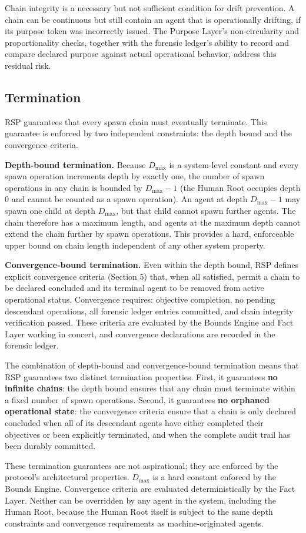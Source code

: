 Chain integrity is a necessary but not sufficient condition for drift prevention. A chain can be continuous but still contain an agent that is operationally drifting, if its purpose token was incorrectly issued. The Purpose Layer's non-circularity and proportionality checks, together with the forensic ledger's ability to record and compare declared purpose against actual operational behavior, address this residual risk.

\subsection{Termination}

RSP guarantees that every spawn chain must eventually terminate. This guarantee is enforced by two independent constraints: the depth bound and the convergence criteria.

\textbf{Depth-bound termination.} Because $D_{\max}$ is a system-level constant and every spawn operation increments depth by exactly one, the number of spawn operations in any chain is bounded by $D_{\max} - 1$ (the Human Root occupies depth 0 and cannot be counted as a spawn operation). An agent at depth $D_{\max} - 1$ may spawn one child at depth $D_{\max}$, but that child cannot spawn further agents. The chain therefore has a maximum length, and agents at the maximum depth cannot extend the chain further by spawn operations. This provides a hard, enforceable upper bound on chain length independent of any other system property.

\textbf{Convergence-bound termination.} Even within the depth bound, RSP defines explicit convergence criteria (Section 5) that, when all satisfied, permit a chain to be declared concluded and its terminal agent to be removed from active operational status. Convergence requires: objective completion, no pending descendant operations, all forensic ledger entries committed, and chain integrity verification passed. These criteria are evaluated by the Bounds Engine and Fact Layer working in concert, and convergence declarations are recorded in the forensic ledger.

The combination of depth-bound and convergence-bound termination means that RSP guarantees two distinct termination properties. First, it guarantees \textbf{no infinite chains}: the depth bound ensures that any chain must terminate within a fixed number of spawn operations. Second, it guarantees \textbf{no orphaned operational state}: the convergence criteria ensure that a chain is only declared concluded when all of its descendant agents have either completed their objectives or been explicitly terminated, and when the complete audit trail has been durably committed.

These termination guarantees are not aspirational; they are enforced by the protocol's architectural properties. $D_{\max}$ is a hard constant enforced by the Bounds Engine. Convergence criteria are evaluated deterministically by the Fact Layer. Neither can be overridden by any agent in the system, including the Human Root, because the Human Root itself is subject to the same depth constraints and convergence requirements as machine-originated agents.

